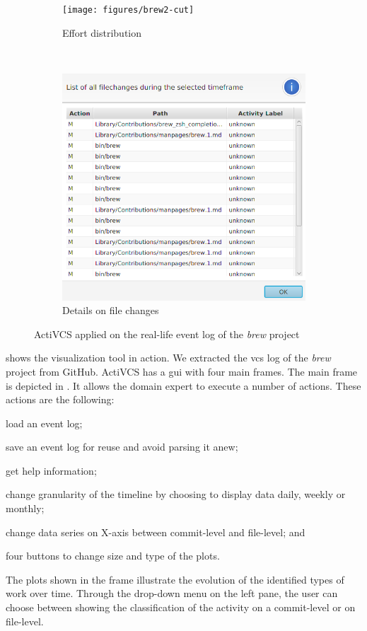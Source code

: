 \begin{figure}[]
\begin{subfigure}[b]{0.7\textwidth}
    \centering
    \texttt{[image: figures/brew2-cut]}
    \caption{Effort distribution}
    \label{fig:brew2}
\end{subfigure}~
\begin{subfigure}[b]{0.3\textwidth}
    \centering
    \includegraphics[width=\textwidth]{figures/brew1-cut}
    \caption{Details on file changes}
    \label{fig:brew1}
\end{subfigure}

\caption{ActiVCS applied on the real-life event log of the \textsl{brew} project}
\label{fig:activcs-screenshots}
\end{figure}

 shows the visualization tool in action. We extracted the \gls{vcs} log of the \textsl{brew} project from GitHub. ActiVCS has a \gls{gui} with four main frames. The main frame is depicted in . It allows the domain expert to execute a number of actions. These actions are the following: \begin{inparaenum}[\itshape i)] 
\item load an event log; 
\item save an event log for reuse and avoid parsing it anew;
\item get help information;
\item change granularity of the timeline by choosing to display data daily, weekly or monthly; 
\item change data series on X-axis between commit-level and file-level; and
\item four buttons to change size and type of the plots.
\end{inparaenum}
The plots shown in the frame illustrate the evolution of the identified types of work over time. Through the drop-down menu on the left pane, the user can choose between showing the classification of the activity on a commit-level or on file-level.  

